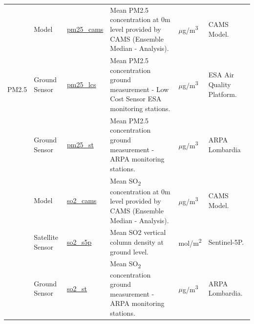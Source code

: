 \begin{center}
\begin{longtable}{ |p{1.5cm}|p{1.5cm}|p{2.3cm}|p{4cm}|p{2cm}|p{2.3cm}| }
\multirow{3}{4em}{PM2.5} & Model  & \underline{pm25\_cams} & Mean PM2.5 concentration at 0m level provided by CAMS  (Ensemble Median - Analysis).\par &
$\mu$g/m\textsuperscript{3} & CAMS Model.\\ 
& Ground \newline Sensor  & \underline{pm25\_lcs} &  Mean PM2.5 concentration ground measurement - Low Cost Sensor ESA monitoring stations.\par & $\mu$g/m\textsuperscript{3} & ESA Air Quality Platform.\\ 
& Ground \newline Sensor & \underline{pm25\_st} &  Mean PM2.5 concentration ground measurement - ARPA monitoring stations. \par & $\mu$g/m\textsuperscript{3} & ARPA \newline Lombardia\\ \hline
\pagebreak
\hline
\multirow{3}{4em}{SO\textsubscript{2}} & Model  & \underline{so2\_cams} & Mean SO\textsubscript{2} concentration at 0m level provided by CAMS  (Ensemble Median - Analysis).\par & $\mu$g/m\textsuperscript{3} & CAMS Model.\\ 
& Satellite \newline Sensor  & \underline{so2\_s5p} &  Mean SO2  vertical column density at ground level. \par& mol/m\textsuperscript{2} & Sentinel-5P.\\ 
& Ground \newline Sensor & \underline{so2\_st} &  Mean SO\textsubscript{2} concentration ground measurement - ARPA monitoring stations. \par & $\mu$g/m\textsuperscript{3} & ARPA \newline Lombardia.\\ \hline



\end{longtable}
\end{center}
